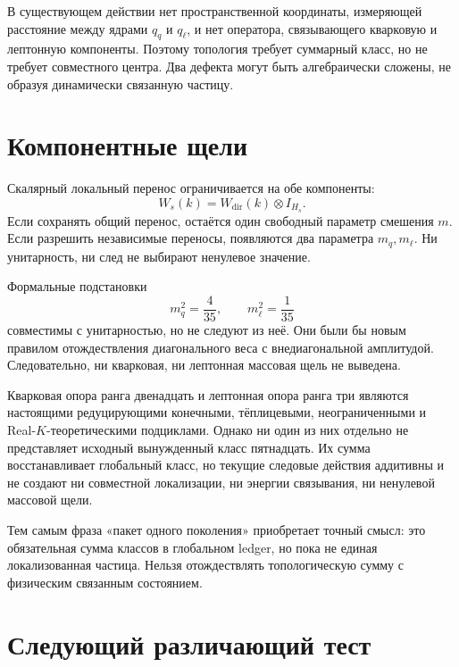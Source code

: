 В существующем действии нет пространственной координаты, измеряющей
расстояние между ядрами $q_q$ и $q_\ell$, и нет оператора, связывающего
кварковую и лептонную компоненты. Поэтому топология требует суммарный
класс, но не требует совместного центра. Два дефекта могут быть
алгебраически сложены, не образуя динамически связанную частицу.

\section{Компонентные щели}

Скалярный локальный перенос ограничивается на обе компоненты:
\begin{equation}
 W_s(k)=W_{\mathrm{dir}}(k)\otimes I_{H_s}.
\end{equation}
Если сохранять общий перенос, остаётся один свободный параметр смешения
$m$. Если разрешить независимые переносы, появляются два параметра
$m_q,m_\ell$. Ни унитарность, ни след не выбирают ненулевое значение.

Формальные подстановки
\begin{equation}
 m_q^2=\frac4{35},
 \qquad
 m_\ell^2=\frac1{35}
\end{equation}
совместимы с унитарностью, но не следуют из неё. Они были бы новым
правилом отождествления диагонального веса с внедиагональной амплитудой.
Следовательно, ни кварковая, ни лептонная массовая щель не выведена.

\begin{theorem}
Кварковая опора ранга двенадцать и лептонная опора ранга три являются
настоящими редуцирующими конечными, тёплицевыми, неограниченными и
Real-$K$-теоретическими подциклами. Однако ни один из них отдельно не
представляет исходный вынужденный класс пятнадцать. Их сумма восстанавливает
глобальный класс, но текущие следовые действия аддитивны и не создают ни
совместной локализации, ни энергии связывания, ни ненулевой массовой щели.
\end{theorem}

\begin{remark}
Тем самым фраза «пакет одного поколения» приобретает точный смысл: это
обязательная сумма классов в глобальном ledger, но пока не единая
локализованная частица. Нельзя отождествлять топологическую сумму с
физическим связанным состоянием.
\end{remark}

\section{Следующий различающий тест}

